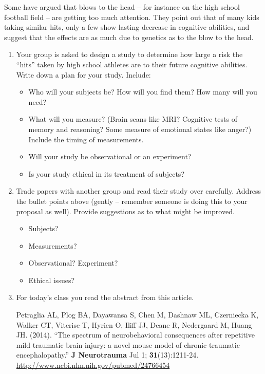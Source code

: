  Some have argued that blows to the head -- for instance on the
    high school football field -- are getting too much attention.
    They point out that of many kids taking similar hits, only a few
    show lasting decrease in cognitive abilities, and suggest that the
    effects are as  much due to genetics as to the blow to the head.
    \begin{enumerate}
    \item Your group is asked to design a study to
      determine how large a risk the ``hits'' taken by high school
      athletes are to their future cognitive abilities. Write down
      a plan for your study.  Include:
      \begin{itemize}
      \item Who will your subjects be?  How will you find them? How
        many will you need? 
      \item What will you measure? (Brain scans like MRI?  Cognitive
        tests of memory and reasoning?  Some measure of emotional
        states like anger?) Include the timing of measurements.
      \item Will your study be observational or an experiment?
      \item Is your study ethical in its treatment of subjects?
      \end{itemize}
   \newpage
      \vspace*{2.5in}

    \item Trade papers with another group and read their study over
      carefully. Address the bullet points above  (gently --
      remember someone is doing this to your proposal as well).
      Provide suggestions as to what might be improved.
      \begin{itemize}
      \item Subjects?
      \item Measurements?
      \item Observational? Experiment?
      \item Ethical issues?
      \end{itemize}
      \vspace{5in}

  


\item   For today's class you read the abstract from this  article.

Petraglia AL, Plog BA, Dayawansa S, Chen M, Dashnaw ML, Czerniecka K,
Walker CT, Viterise T, Hyrien O, Iliff JJ, Deane R, Nedergaard M,
Huang JH. (2014). ``The spectrum of neurobehavioral consequences after repetitive mild traumatic brain injury: a novel mouse model of chronic traumatic encephalopathy.''
{\bf J Neurotrauma} Jul 1; {\bf 31}(13):1211-24. 
\url{http://www.ncbi.nlm.nih.gov/pubmed/24766454}


\end{enumerate}
